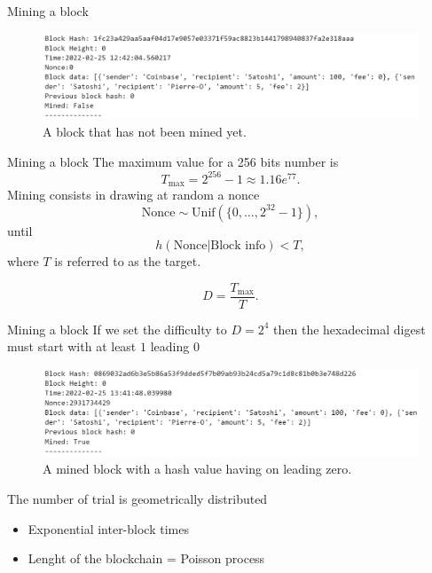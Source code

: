 \documentclass{beamer}
\begin{document}
\begin{frame}{Mining a block}
\begin{figure}[!ht]
    \includegraphics[width = \textwidth]{../../Figures/block_not_mined.png}
    \captionsetup{width=0.8\textwidth}
    \centering
    \caption{A block that has not been mined yet.}
    \label{fig:block_not_mined}
\end{figure}
\end{frame}
\begin{frame}{Mining a block}
The maximum value for a 256 bits number is
$$
T_\text{max} = 2^{256}-1 \approx 1.16e^{77}.
$$
Mining consists in drawing at random a nonce 
$$
\text{Nonce} \sim \text{Unif}(\{0,\ldots, 2^{32}-1\}),
$$
until 
$$
h(\text{Nonce}|\text{Block info})<T,
$$
where $T$ is referred to as the target.
\begin{tcolorbox}[enhanced,drop shadow, title=Difficulty of the cryptopuzzle]
$$
D = \frac{T_{\max}}{T}.
$$
\end{tcolorbox}

\end{frame}
\begin{frame}{Mining a block}
If we set the difficulty to $D = 2^4$ then the hexadecimal digest must start with at least $1$ leading $0$
\begin{figure}[!ht]
    \includegraphics[width = \textwidth]{../../Figures/block_mined.png}
    \captionsetup{width=0.8\textwidth}
    \centering
    \caption{A mined block with a hash value having on leading zero.}
    \label{fig:block_mined}
\end{figure}
The number of trial is geometrically distributed
\begin{itemize}
\item Exponential inter-block times
\item Lenght of the blockchain = Poisson process
\end{itemize}
\end{frame}
\end{document}
